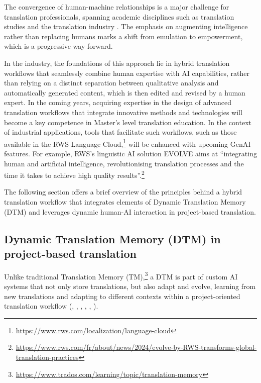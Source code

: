 \documentclass[output=paper]{langscibook}
\begin{document}
The convergence of human-machine relationships is a major challenge for translation professionals, spanning academic disciplines such as translation studies and the translation industry \citep{raus23}. The emphasis on augmenting intelligence rather than replacing humans marks a shift from emulation to empowerment, which is a progressive way forward.

In the industry, the foundations of this approach lie in hybrid translation workflows that seamlessly combine human expertise with AI capabilities, rather than relying on a distinct separation between qualitative analysis and automatically generated content, which is then edited and revised by a human expert. In the coming years, acquiring expertise in the design of advanced translation workflows that integrate innovative methods and technologies will become a key competence in Master’s level translation education. In the context of industrial applications, tools that facilitate such workflows, such as those available in the RWS Language Cloud,\footnote{\url{https://www.rws.com/localization/language-cloud}} will be enhanced with upcoming GenAI features. For example, RWS’s linguistic AI solution EVOLVE aims at “integrating human and artificial intelligence, revolutionising translation processes and the time it takes to achieve high quality results”.\footnote{\url{https://www.rws.com/fr/about/news/2024/evolve-by-RWS-transforms-global-translation-practices}}

The following section offers a brief overview of the principles behind a hybrid translation workflow that integrates elements of Dynamic Translation Memory (DTM) and leverages dynamic human-AI interaction in project-based translation.

\subsection{Dynamic Translation Memory (DTM) in project-based translation}
Unlike traditional Translation Memory (TM),\footnote{\url{https://www.trados.com/learning/topic/translation-memory}} a DTM is part of custom AI systems that not only store translations, but also adapt and evolve, learning from new translations and adapting to different contexts within a project-oriented translation workflow (\citealt{hao_where_2023}, \citealt{KimBokeyong2022}, \citealt{sinwai23}, \citealt{zimina15}, \citealt{ziminafleury16}, \citealt{zimina19}).
\end{document}
